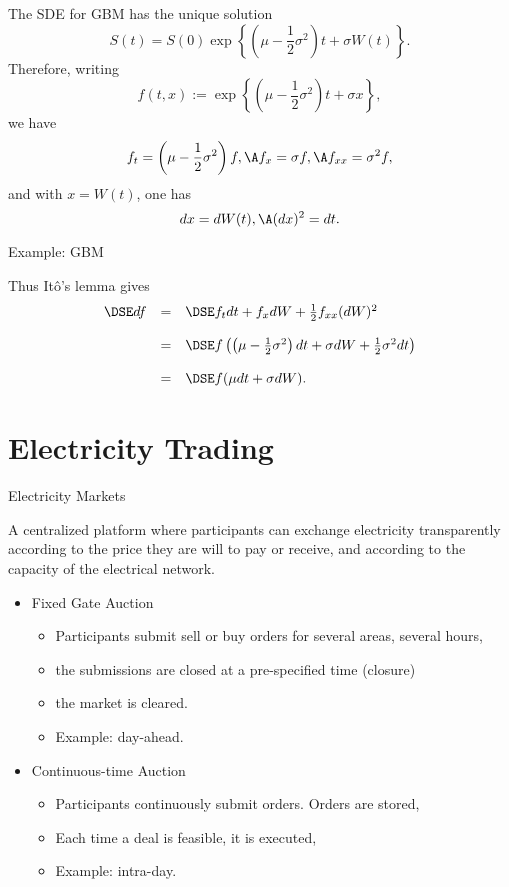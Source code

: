 The SDE for GBM has the unique
solution
$$
S(t) = S(0) \exp \left\{\left(\mu - \frac{1}{2}\sigma^2\right)t +
\sigma W(t) \right\}\!.
$$
Therefore, writing
$$
f(t,x) := \exp\left\{\left(\mu - \frac{1}{2}\sigma^2\right)t +
\sigma x \right\}\!,
$$
we have
$$
f_t = \left(\mu - \frac{1}{2}\sigma^2\right)f, \A f_x = \sigma f,
\A f_{xx} = \sigma^2 f,
$$
and with $x = W(t)$, one has
$$
dx = dW(t), \A (dx)^2 = dt.
$$

{ Example: GBM}

Thus It\^{o}'s lemma gives
$$
\begin{array}{lll}
\DSE df &=&\DSE f_t dt + f_x dW + \frac{1}{2} f_{xx}
(dW)^2\\*[12pt] &=&\DSE f\left(\left(\mu -
\frac{1}{2}{\sigma}^2\right) dt + \sigma dW +
\frac{1}{2}{\sigma}^2 dt\right)\\*[12pt] &=&\DSE f(\mu dt + \sigma
dW).
\end{array}
$$

\section{Electricity Trading}

{Electricity Markets}

A centralized platform where participants can exchange electricity transparently
according to the price they are will to pay or receive, and according to the capacity of
the electrical network.

\begin{itemize}
\item<1-> Fixed Gate Auction
\begin{itemize}
\item Participants submit sell or buy orders for several areas, several hours,
\item the submissions are closed at a pre-specified time (closure)
\item the market is cleared.
\item Example: day-ahead.
\end{itemize}
\item<2-> Continuous-time Auction
\begin{itemize}
\item Participants continuously submit orders. Orders are stored,
\item Each time a deal is feasible, it is executed,
\item Example: intra-day.
\end{itemize}

\end{itemize}


